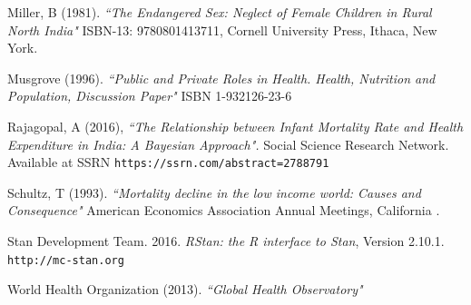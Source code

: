 \documentclass{article}
\begin{document}
\begin{thebibliography}{9}
Miller, B (1981).
\textit{``The Endangered Sex: Neglect of Female Children in Rural North India"}
ISBN-13: 9780801413711, Cornell University Press, Ithaca, New York.

Musgrove (1996).
\textit{``Public and Private Roles in Health. Health, Nutrition and Population, Discussion Paper"}
ISBN 1-932126-23-6


Rajagopal, A (2016), \textit{``The Relationship between Infant Mortality Rate and Health Expenditure in India: A Bayesian Approach".}
Social Science Research Network. Available at SSRN \texttt{https://ssrn.com/abstract=2788791}

Schultz, T (1993).
\textit{``Mortality decline in the low income world: Causes and Consequence"}
American Economics Association Annual Meetings, California .

Stan Development Team. 2016. 
\textit{RStan: the R interface to Stan}, Version 2.10.1.   
\texttt{http://mc-stan.org}

World Health Organization (2013).
\textit{``Global Health Observatory"}



\end{thebibliography}
\end{document}
